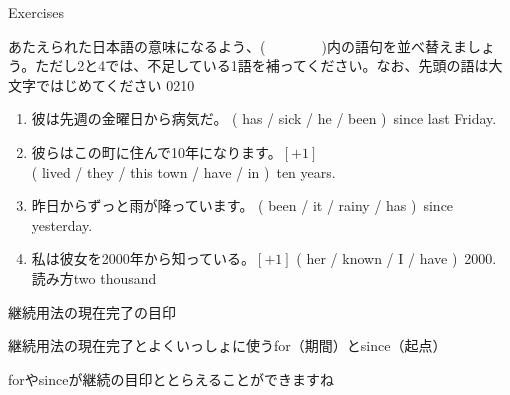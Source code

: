 \documentclass[aspectratio=169,xcolor={dvipsnames,table}]{beamer}
\newcommand{\myaudio}[1]{\href{#1}{\faVolumeUp}}
\begin{document}
\begin{frame}[plain]{Exercises}

{\small あたえられた日本語の意味になるよう、(~~~~~~~~)内の語句を並べ替えましょう。ただし2と4では、不足している1語を補ってください。なお、先頭の語は大文字ではじめてください}%
\hfill{\tiny 0210}\,{\scriptsize \myaudio{./audio/012_have_pp_keizoku_06.mp3}}

 \begin{enumerate}
  \item {\small 彼は先週の金曜日から病気だ。}\hfill%
( has / sick /  he / been )\,\,\,since last  Friday.\\
  \item 
{\small 彼らはこの町に住んで10年になります。}$[+1]$\\
( lived / they / this town / have / in )\,\,\,ten years.\\
  \item 
{\small 昨日からずっと雨が降っています。}
\hfill{}( been / it / rainy / has )\,\,\,since yesterday.\\
  \item 
{\small 私は彼女を2000年から知っている。}$[+1]$\hfill%
( her / known / I / have )\,\,\,2000.\\
\hfill{\scriptsize 読み方two thousand }
 \end{enumerate}
\end{frame}
\begin{frame}[plain]{継続用法の現在完了の目印}
\large

継続用法の現在完了とよくいっしょに使うfor（期間）とsince（起点）

forやsinceが継続の目印ととらえることができますね
\end{frame}
\end{document}
